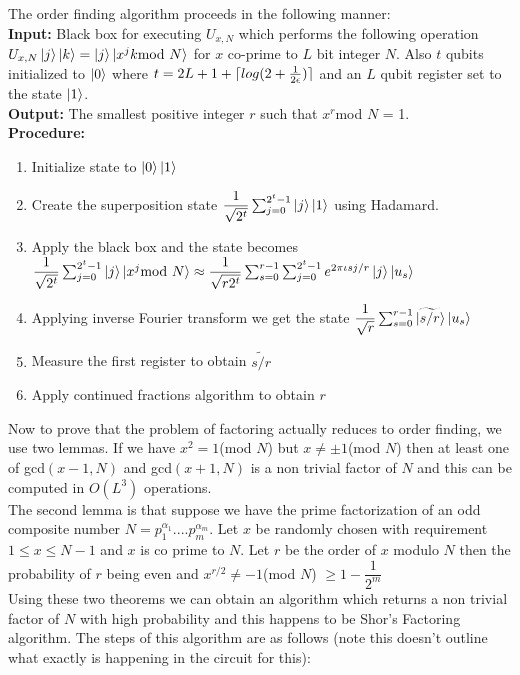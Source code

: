 \documentclass{report}
\DeclarePairedDelimiter{\ceil}{\lceil}{\rceil}
\begin{document}
The order finding algorithm proceeds in the following manner:\\
\textbf{Input: }Black box for executing $U_{x,N}$ which performs the following operation $U_{x,N}\ket{j}\ket{k} = \ket{j}\ket{x^{j}k\text{mod }N}$ for $x$ co-prime to $L$ bit integer $N$. Also $t$ qubits initialized to $\ket{0}$ where $t = 2L + 1 + \ceil{log(2 + \frac{1}{2\epsilon})}$ and an $L$ qubit register set to the state $\ket{1}$.\\
\textbf{Output: } The smallest positive integer $r$ such that $x^r$mod $N$ = 1.\\
\textbf{Procedure:}
\begin{enumerate}
\item Initialize state to $\ket{0}\ket{1}$
\item Create the superposition state $\dfrac{1}{\sqrt{2^t}}\sum_{j=0}^{2^t-1}\ket{j}\ket{1}$ using Hadamard.
\item Apply the black box and the state becomes $\dfrac{1}{\sqrt{2^t}}\sum_{j=0}^{2^t-1}\ket{j}\ket{x^{j}\text{mod }N} \approx \dfrac{1}{\sqrt{r2^t}}\sum_{s=0}^{r-1}\sum_{j=0}^{2^t-1}e^{2\pi\iota{sj}/r}\ket{j}\ket{u_s}$
\item Applying inverse Fourier transform we get the state $\dfrac{1}{\sqrt{r}}\sum_{s=0}^{r-1}\ket{\widetilde{s/r}}\ket{u_s}$
\item Measure the first register to obtain $\widetilde{s/r}$
\item Apply continued fractions algorithm to obtain $r$
\end{enumerate}
Now to prove that the problem of factoring actually reduces to order finding, we use two lemmas. If we have $x^2 = 1$(mod $N$) but $x \neq \pm 1$(mod $N$) then at least one of gcd$(x-1,N)$ and gcd$(x+1,N)$ is a non trivial factor of $N$ and this can be computed in $O(L^3)$ operations.
\\
The second lemma is that suppose we have the prime factorization of an odd composite number $N = p_{1}^{\alpha_1}....p_{m}^{\alpha_m}$. Let $x$ be randomly chosen with requirement $1 \leq x \leq N-1$ and $x$ is co prime to $N$. Let $r$ be the order of $x$ modulo $N$ then the probability of $r$ being even and $x^{r/2} \neq -1$(mod $N$) $\geq 1 - \dfrac{1}{2^m}$\\
Using these two theorems we can obtain an algorithm which returns a non trivial factor of $N$ with high probability and this happens to be Shor's Factoring algorithm. The steps of this algorithm are as follows (note this doesn't outline what exactly is happening in the circuit for this):\\
\end{document}
